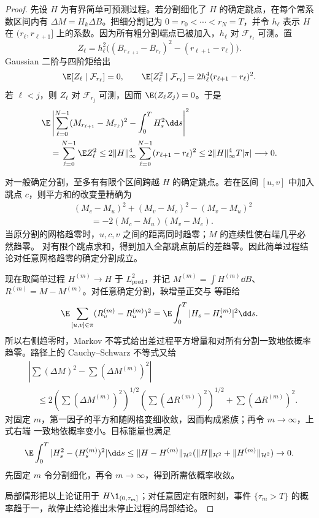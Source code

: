 \begin{proof}
先设 $H$ 为有界简单可预测过程。若分割细化了 $H$ 的确定跳点，在每个常系数区间内有
$\Delta M=H_k\Delta B$。把细分割记为 $0=r_0<\cdots<r_N=T$，并令 $h_\ell$ 表示
$H$ 在 $(r_\ell,r_{\ell+1}]$ 上的系数。因为所有粗分割端点已被加入，$h_\ell$ 对
$\mathcal F_{r_\ell}$ 可测。置
\[
 Z_\ell=h_\ell^2\bigl((B_{r_{\ell+1}}-B_{r_\ell})^2-(r_{\ell+1}-r_\ell)\bigr).
\]
Gaussian 二阶与四阶矩给出
\[
 \E[Z_\ell\mid\mathcal F_{r_\ell}]=0,
 \qquad
 \E[Z_\ell^2\mid\mathcal F_{r_\ell}]
 =2h_\ell^4(r_{\ell+1}-r_\ell)^2.
\]
若 $\ell<j$，则 $Z_\ell$ 对 $\mathcal F_{r_j}$ 可测，因而
$\E(Z_\ell Z_j)=0$。于是
\begin{align*}
 &\E\left|
 \sum_{\ell=0}^{N-1}(M_{r_{\ell+1}}-M_{r_\ell})^2
 -\int_0^TH_s^2\dd s
 \right|^2\\
 &\quad=\sum_{\ell=0}^{N-1}\E Z_\ell^2
 \le2\|H\|_\infty^4\sum_{\ell=0}^{N-1}(r_{\ell+1}-r_\ell)^2
 \le2\|H\|_\infty^4T|\pi|\longrightarrow0.
\end{align*}

对一般确定分割，至多有有限个区间跨越 $H$ 的确定跳点。若在区间 $[u,v]$ 中加入跳点
$c$，则平方和的改变量精确为
\begin{align*}
 &(M_c-M_u)^2+(M_v-M_c)^2-(M_v-M_u)^2\\
 &\qquad=-2(M_c-M_u)(M_v-M_c).
\end{align*}
当原分割的网格趋零时，$u,c,v$ 之间的距离同时趋零；$M$ 的连续性使右端几乎必然趋零。
对有限个跳点求和，得到加入全部跳点前后的差趋零。因此简单过程结论对任意网格趋零的确定分割成立。

现在取简单过程 $H^{(m)}\to H$ 于 $L^2_{\mathrm{pred}}$，并记
$M^{(m)}=\int H^{(m)}\dd B$、$R^{(m)}=M-M^{(m)}$。对任意确定分割，鞅增量正交与 \Ito{} 等距给
\[
 \E\sum_{[u,v]\in\pi}(R_v^{(m)}-R_u^{(m)})^2
 =\E\int_0^T|H_s-H_s^{(m)}|^2\dd s.
\]
所以右侧趋零时，Markov 不等式给出差过程平方增量和对所有分割一致地依概率趋零。路径上的
Cauchy--Schwarz 不等式又给
\begin{align*}
 &\left|\sum(\Delta M)^2-\sum(\Delta M^{(m)})^2\right|\\
 &\quad\le
 2\left(\sum(\Delta M^{(m)})^2\right)^{1/2}
   \left(\sum(\Delta R^{(m)})^2\right)^{1/2}
 +\sum(\Delta R^{(m)})^2.
\end{align*}
对固定 $m$，第一因子的平方和随网格变细收敛，因而构成紧族；再令 $m\to\infty$，上式右端
一致地依概率变小。目标能量也满足
\[
 \E\int_0^T|H_s^2-(H_s^{(m)})^2|\dd s
 \le\|H-H^{(m)}\|_{\mathcal H^2}
    (\|H\|_{\mathcal H^2}+\|H^{(m)}\|_{\mathcal H^2})\to0.
\]
先固定 $m$ 令分割细化，再令 $m\to\infty$，得到所需依概率收敛。

局部情形把以上论证用于 $H\1_{(0,\tau_m]}$；对任意固定有限时刻，事件
$\{\tau_m>T\}$ 的概率趋于一，故停止结论推出未停止过程的局部结论。
\end{proof}

